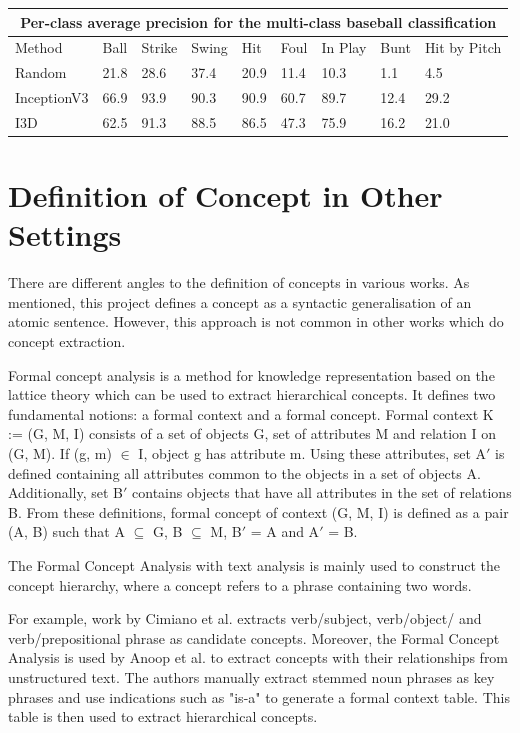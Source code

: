 \begin{center}
\begin{tabular}{ |p{2cm}|p{1cm} p{1cm} p{1cm} p{1cm} p{1cm} p{1cm} p{1cm} p{1cm}|  }
 \hline
 \multicolumn{9}{|c|}{Per-class average precision for the multi-class baseball classification} \\
 \hline
 Method & Ball & Strike & Swing & Hit & Foul & In Play & Bunt & Hit by Pitch \\
 \hline
 Random & 21.8 & 28.6 & 37.4 & 20.9 & 11.4 & 10.3 & 1.1 & 4.5 \\
 InceptionV3 & 66.9 & 93.9 & 90.3 & 90.9 & 60.7 & 89.7 & 12.4 & 29.2 \\
 I3D & 62.5 & 91.3 & 88.5 & 86.5 & 47.3 & 75.9 & 16.2 & 21.0 \\
 \hline
 
\end{tabular}
\label{inclusion-exclusion-rules}
\end{center}


\section{Definition of Concept in Other Settings}

There are different angles to the definition of concepts in various works.
As mentioned, this project defines a concept as a syntactic generalisation of an atomic sentence.
However, this approach is not common in other works which do concept extraction.


Formal concept analysis \cite{RefWorks:RefID:31-ganter2012formal} is a method for knowledge representation based on the lattice theory which can be used to extract hierarchical concepts.
It defines two fundamental notions: a formal context and a formal concept. 
Formal context K := (G, M, I) consists of a set of objects G, set of attributes M and relation I on (G, M).
If (g, m) $\in$ I, object g has attribute m.
Using these attributes, set A$' $ is defined containing all attributes common to the objects in a set of objects A.
Additionally, set B$' $ contains objects that have all attributes in the set of relations B.
From these definitions, formal concept of context (G, M, I) is defined as a pair (A, B) such that A $\subseteq$ G, B $\subseteq$ M, B$' $ = A and A$' $ = B.

The Formal Concept Analysis with text analysis is mainly used to construct the concept hierarchy, where a concept refers to a phrase containing two words.

For example, work by Cimiano et al. \cite{RefWorks:RefID:32-cimiano2005learning} extracts verb/subject, verb/object/ and verb/prepositional phrase as candidate concepts.
Moreover, the Formal Concept Analysis is used by Anoop et al. \cite{RefWorks:RefID:33-anoop2019extracting} to extract concepts with their relationships from unstructured text.
The authors manually extract stemmed noun phrases as key phrases and use indications such as "is-a" to generate a formal context table.
This table is then used to extract hierarchical concepts.

